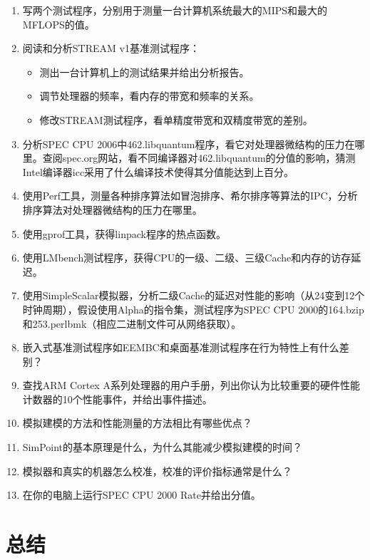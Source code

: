 \documentclass[]{ctexbook}
\providecommand{\tightlist}{%
  \setlength{\itemsep}{0pt}\setlength{\parskip}{0pt}}
\begin{document}
\begin{enumerate}
\def\labelenumi{\arabic{enumi}.}
\tightlist
\item
  写两个测试程序，分别用于测量一台计算机系统最大的MIPS和最大的MFLOPS的值。
\item
  阅读和分析STREAM v1基准测试程序：

  \begin{itemize}
  \tightlist
  \item
    测出一台计算机上的测试结果并给出分析报告。
  \item
    调节处理器的频率，看内存的带宽和频率的关系。
  \item
    修改STREAM测试程序，看单精度带宽和双精度带宽的差别。
  \end{itemize}
\item
  分析SPEC CPU 2006中462.libquantum程序，看它对处理器微结构的压力在哪里。查阅spec.org网站，看不同编译器对462.libquantum的分值的影响，猜测Intel编译器icc采用了什么编译技术使得其分值能达到上百分。
\item
  使用Perf工具，测量各种排序算法如冒泡排序、希尔排序等算法的IPC，分析排序算法对处理器微结构的压力在哪里。
\item
  使用gprof工具，获得linpack程序的热点函数。
\item
  使用LMbench测试程序，获得CPU的一级、二级、三级Cache和内存的访存延迟。
\item
  使用SimpleScalar模拟器，分析二级Cache的延迟对性能的影响（从24变到12个时钟周期），假设使用Alpha的指令集，测试程序为SPEC CPU 2000的164.bzip和253.perlbmk（相应二进制文件可从网络获取）。
\item
  嵌入式基准测试程序如EEMBC和桌面基准测试程序在行为特性上有什么差别？
\item
  查找ARM Cortex A系列处理器的用户手册，列出你认为比较重要的硬件性能计数器的10个性能事件，并给出事件描述。
\item
  模拟建模的方法和性能测量的方法相比有哪些优点？
\item
  SimPoint的基本原理是什么，为什么其能减少模拟建模的时间？
\item
  模拟器和真实的机器怎么校准，校准的评价指标通常是什么？
\item
  在你的电脑上运行SPEC CPU 2000 Rate并给出分值。
\end{enumerate}

\newpage

\hypertarget{ux603bux7ed3}{%
\chapter*{总结}\label{ux603bux7ed3}}
\end{document}
